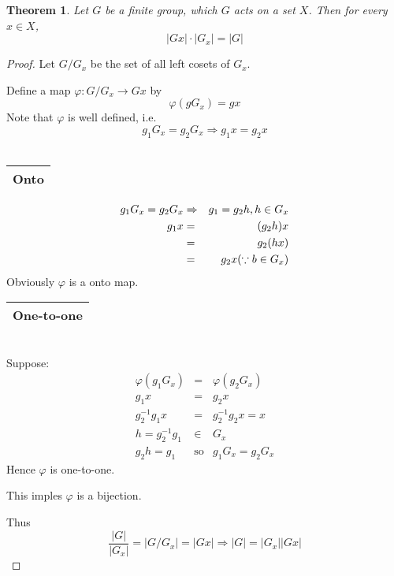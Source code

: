 \documentclass{article}
\theoremstyle{MyNonumberplain}
\theoremstyle{break}
\newtheorem*{proof}{Proof. }
\newcommand{\tmop}{\text}
\theoremstyle{break}
\newtheorem{theorem}{Theorem}[section]
\theoremstyle{break}
\theoremstyle{definition}
\theoremstyle{break}
\begin{document}
\begin{thmbox}
    \begin{theorem}
        Let $G$ be a finite group, which $G$ acts on a set $X$. Then for every $x \in
X$,
\[ | G x | \cdot | G_x | = | G | \]
    \end{theorem}
    \begin{prfbox}
        \begin{proof}
            Let $G / G_x$ be the set of all left cosets of $G_x$.\bigskip

            Define a map $\varphi : G / G_x \rightarrow G x$ by
            \[ \varphi (g G_x) = g x \]
            Note that $\varphi$ is well defined, i.e.
            \[ g_1 G_x = g_2 G_x \Rightarrow g_1 x = g_2 x \]\\
            \begin{tabular}{|c|}
            \hline
            Onto\\
            \hline
            \end{tabular}
            \begin{eqnarray*}
            g_1 G_x = g_2 G_x & \Rightarrow & g_1 = g_2 h, h \in G_x\\
            g_1 x & = & (g_2 h) x\\
            & = & g_2 (h x)\\
            & = & g_2 x \hspace*{\fill} (\because b \in G_x)
            \end{eqnarray*}
            Obviously $\varphi$ is a onto map.\bigskip

            \begin{tabular}{|c|}
            \hline
            One-to-one\\
            \hline
            \end{tabular}\\

            Suppose:
            \begin{eqnarray*}
            \varphi (g_1 G_x) & = & \varphi (g_2 G_x)\\
            g_1 x & = & g_2 x\\
            g_2^{- 1} g_1 x & = & g^{- 1}_2 g_2 x = x\\
            h = g_2^{- 1} g_1 & \in & G_x\\
            g_2 h = g_1 & \tmop{so} & g_1 G_x = g_2 G_x
            \end{eqnarray*}
            Hence $\varphi$ is one-to-one.\bigskip

            This imples $\varphi$ is a bijection.\bigskip

            Thus
            \[ \frac{| G |}{| G_x |} = | G / G_x | = | G x | \Rightarrow | G | = | G_x |
            | G x | \]
        \end{proof}
    \end{prfbox}
\end{thmbox}
\end{document}
